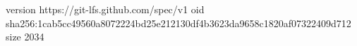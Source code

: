 version https://git-lfs.github.com/spec/v1
oid sha256:1cab5cc49560a8072224bd25e212130df4b3623da9658c1820af07322409d712
size 2034
